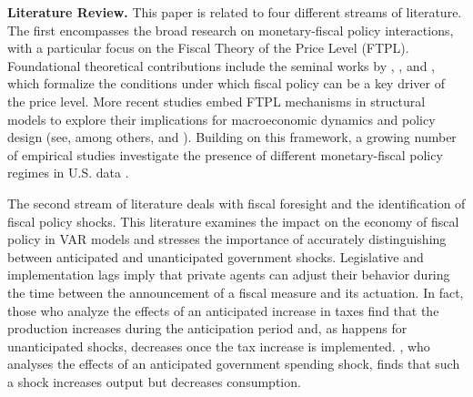 \documentclass[12pt]{article}%
\theoremstyle{remark}
\begin{document}
\textbf{Literature Review.} This paper is related to four different streams of literature. 
The first encompasses the broad research on monetary-fiscal policy interactions, with a particular focus on the Fiscal Theory of the Price Level (FTPL). Foundational theoretical contributions include the seminal works by \cite{sargentWallace1981}, \cite{Leeper1991}, \cite{Sims1994} and \cite{Woodford2001}, which formalize the conditions under which fiscal policy can be a key driver of the price level. More recent studies embed FTPL mechanisms in structural models to explore their implications for macroeconomic dynamics and policy design (see, among others, \cite{Cochranebook} and \cite{leeperleithcampbell2016understanding}).
Building on this framework, a growing number of empirical studies investigate the presence of different monetary-fiscal policy regimes in U.S. data \citep[see, among the others,][]{Bianchi2012,Bianchiillut,AscariFlorioGobbi2020, BM2014, JacobsonLeeperPreston2024}.  


The second stream of literature deals with fiscal foresight and the identification of fiscal policy shocks. This literature examines the impact on the economy of fiscal policy in VAR models \citep[e.g., see][]{ BP,Ramey2011,AuGoro2012,ForniGambetti2016,RameyShapiro,MERTENS2011,MertensRavn2012,BenZeev2017,Fisher} and stresses the importance of accurately distinguishing between anticipated and unanticipated government shocks. Legislative and implementation lags imply that private agents can adjust their behavior during the time between the announcement of a fiscal measure and its actuation. In fact, those who analyze the effects of an anticipated increase in taxes \citep[see][]{MertensRavn2012,MERTENS2011} find that the production increases during the anticipation period and, as happens for unanticipated shocks, decreases once the tax increase is implemented. \cite{Ramey2011}, who analyses the effects of an anticipated government spending shock, finds that such a shock increases output but decreases consumption. 
\end{document}
